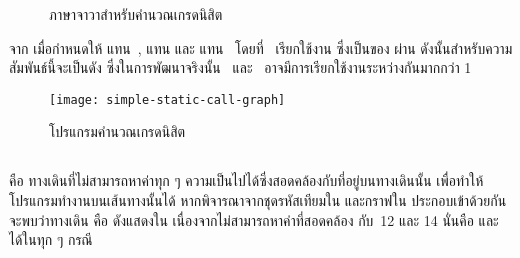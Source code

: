 {{\begin{figure}[ht!]
    \lstset{basicstyle=\small,style=thesiscodestyle}
    
    \caption{{\sourcecode}ภาษาจาวาสำหรับคำนวณเกรดนิสิต}
    \label{fig:javaGrading}
\end{figure}

\clearpage
จาก เมื่อกำหนดให้  แทน\class\ ,  แทน{\class}  
และ  แทน\class\  โดยที่\class\  เรียกใช้งาน{\method}  
ซึ่งเป็น{\method}ของ{\class}  ผ่าน{\method} {} ดังนั้น{\scg}สำหรับความสัมพันธ์นี้จะเป็นดัง
{} ซึ่งในการพัฒนาจริงนั้น\class\  และ\class\ 
อาจมีการเรียกใช้งานระหว่างกันมากกว่า 1 \method %

\begin{figure}[htb!]
    \centering
    \texttt{[image: simple-static-call-graph]}
    \caption{{\scg}โปรแกรมคำนวณเกรดนิสิต}
    \label{fig:scggrading}
\end{figure}

\subsection{\FirstTimeDefine{\InfeasiblePath}{\InfeasiblePathEN}}

\InfeasiblePath คือ ทางเดินที่ไม่สามารถหาค่าทุก ๆ ความเป็นไปได้ซึ่งสอดคล้องกับ{\PredicateNode}ที่อยู่บนทางเดินนั้น 
เพื่อทำให้โปรแกรมทำงานบนเส้นทางนั้นได้ \cite{Naik2008} หากพิจารณาจากชุดรหัสเทียมใน{} 
และกราฟใน{} ประกอบเข้าด้วยกัน จะพบว่าทางเดิน 
 คือ {\bf \InfeasiblePath} 
ดังแสดงใน{} เนื่องจากไม่สามารถหาค่าที่สอดคล้อง กับ\PredicateNode\ 12 และ 14 
นั่นคือ  และ  ได้ในทุก ๆ กรณี

}}
